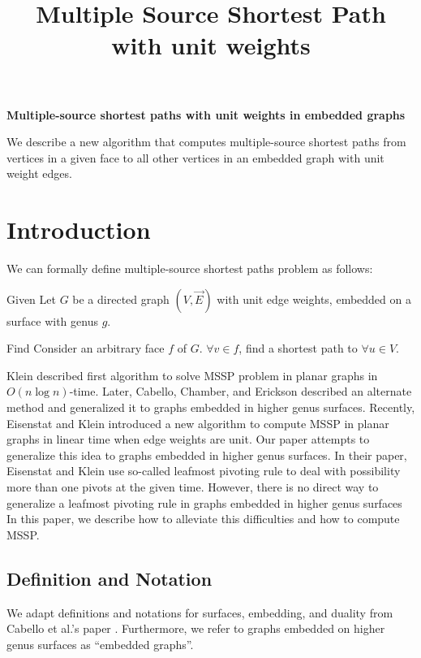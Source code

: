 \documentclass{article}
\begin{document}
\title{Multiple Source Shortest Path with unit weights}

\begin{center}
\textbf{\large Multiple-source shortest paths with unit weights in embedded
graphs}
\end{center}

\DRAFT

\begin{bigabstract}
We describe a new algorithm that computes multiple-source shortest paths from
vertices in a given face to all other vertices in an embedded graph
with unit weight edges.
\end{bigabstract}

\section{Introduction}

We can formally define multiple-source shortest paths problem as follows: 

\begin{oneshot}{Given}
Let $G$ be a directed graph $(V, \vec{E})$ with unit edge weights, embedded on a surface with genus $g$.
\end{oneshot}

\begin{oneshot}{Find}
Consider an arbitrary face $f$ of $G$. $\forall v \in f$, find a shortest path to
$\forall u \in V$.
\end{oneshot}

Klein \cite{klein2005multiple} described first algorithm to solve MSSP problem in planar graphs in $O(n \log{n})$-time. Later, Cabello, Chamber, and Erickson \cite{cabello2013multiple} described an alternate method and generalized it to graphs embedded in higher genus surfaces. 
Recently, Eisenstat and Klein \cite{eisenstat2013linear} introduced a new algorithm to compute MSSP in planar graphs in linear time when edge weights are unit. Our 
paper attempts to generalize this idea to graphs embedded in higher genus surfaces. In their paper, Eisenstat and Klein use so-called leafmost pivoting rule to deal with possibility more than one pivots at the given time. However, there is no direct way 
to generalize a leafmost pivoting rule in graphs embedded in higher genus surfaces 
In this paper, we describe how to alleviate this difficulties and how to compute MSSP. 

\subsection{Definition and Notation}
We adapt definitions and notations for surfaces, embedding, and duality from Cabello et al.'s paper \cite{cabello2013multiple}. Furthermore, we refer to graphs embedded on higher genus surfaces as ``embedded graphs''.
\end{document}
